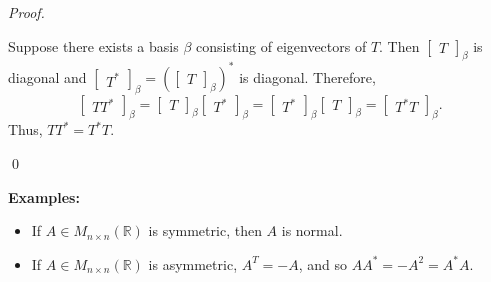 \documentclass[12pt]{article}
\newenvironment{sol}
    {\emph{Proof.}
    }
    {
    \qed
    }
\begin{document}
\begin{sol}
Suppose there exists a basis $\beta$ consisting of eigenvectors of $T$. Then $\begin{bmatrix}
T
\end{bmatrix}_\beta$ is diagonal and $\begin{bmatrix}
T^*
\end{bmatrix}_\beta = \left( \begin{bmatrix}
T
\end{bmatrix}_\beta \right)^*$ is diagonal. Therefore, $$\begin{bmatrix}
TT^*
\end{bmatrix}_\beta = \begin{bmatrix}
T
\end{bmatrix}_\beta \begin{bmatrix}
T^*
\end{bmatrix}_\beta = \begin{bmatrix}
T^*
\end{bmatrix}_\beta \begin{bmatrix}
T
\end{bmatrix}_\beta = \begin{bmatrix}
T^*T
\end{bmatrix}_\beta.$$ Thus, $TT^* = T^*T$.
\end{sol}

\vspace{1em}

\noindent\textbf{Examples:}
\begin{itemize}
    \item If $A \in M_{n \times n}(\mathbb{R})$ is symmetric, then $A$ is normal.
    
    \item If $A \in M_{n \times n}(\mathbb{R})$ is asymmetric, $A^T = -A$, and so $AA^* = -A^2 = A^*A$.
\end{itemize}
\end{document}
